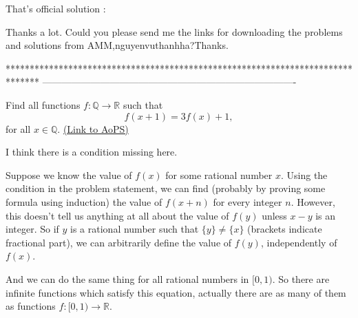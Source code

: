 \begin{solution}
	\begin{italicized}That's official solution :\end{italicized} 
\end{solution}



\begin{solution}
	Thanks a lot.
Could you please send me the links for downloading the problems and solutions from AMM,nguyenvuthanhha?Thanks.
\end{solution}
*******************************************************************************
-------------------------------------------------------------------------------

\begin{problem}
	Find all functions $f: \mathbb Q \to \mathbb R$ such that
\[f(x+1)=3f(x)+1,\]
for all $x \in \mathbb Q$.
	\flushright \href{https://artofproblemsolving.com/community/c6h293185}{(Link to AoPS)}
\end{problem}



\begin{solution}
	I think there is a condition missing here.

Suppose we know the value of $ f(x)$ for some rational number $ x$. Using the condition in the problem statement, we can find (probably by proving some formula using induction) the value of $ f(x+n)$ for every integer $ n$. However, this doesn't tell us anything at all about the value of $ f(y)$ unless $ x-y$ is an integer. So if $ y$ is a rational number such that $ \{y\} \neq \{x\}$ (brackets indicate fractional part), we can arbitrarily define the value of $ f(y)$, independently of $ f(x)$.

And we can do the same thing for all rational numbers in $ [0,1)$. So there are infinite functions which satisfy this equation, actually there are as many of them as functions $ f: [0,1) \rightarrow \mathbb R$.
\end{solution}



